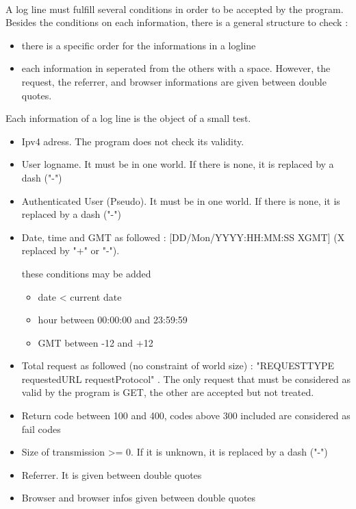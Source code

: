 \documentclass[a4paper, 12pts]{article}
\begin{document}
\paragraph{}
 A log line must fulfill several conditions in order to be accepted by the program. Besides the conditions on each information, there is a general structure to check :
 \begin{itemize}[label=$\square$]
 \item there is a specific order for the informations in a logline
 \item each information in seperated from the others with a space. However, the request, the referrer, and browser informations are given between double quotes.
 \end{itemize}
 Each information of a log line is the object of a small test.
 \begin{itemize}[label=$\square$]
 \item Ipv4 adress. The program does not check its validity.
 \item User logname. It must be in one world. If there is none, it is replaced by a dash ("-")
 \item Authenticated User (Pseudo). It must be in one world. If there is none, it is replaced by a dash ("-")
 \item Date, time and GMT as followed : [DD/Mon/YYYY:HH:MM:SS XGMT] (X replaced by "+" or "-").

 these conditions may be added
 \begin{itemize}
 \item date < current date
 \item hour between 00:00:00 and 23:59:59
 \item GMT between -12 and +12
 \end{itemize}
 \item Total request as followed (no constraint of world size) : "REQUESTTYPE requestedURL requestProtocol" . The only request that must be considered as valid by the program is GET, the other are accepted but not treated.
 \item Return code between 100 and 400, codes above 300 included are considered as fail codes
 \item Size of transmission >= 0. If it is unknown, it is replaced by a dash ("-")
 \item Referrer. It is given between double quotes
\item Browser and browser infos given between double quotes
 \end{itemize}
\end{document}
